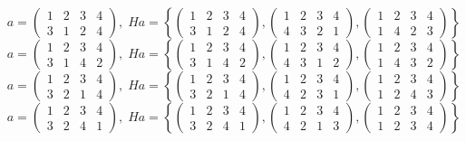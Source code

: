 \documentclass[a4paper,12pt]{article}
\begin{document}
\begin{itemize}
\[a = \begin{pmatrix} 1 & 2 & 3 & 4 \\ 3&1&2&4\end{pmatrix}, \; Ha = \left\{\begin{pmatrix} 1 & 2 & 3 & 4 \\ 3&1&2&4\end{pmatrix}, \begin{pmatrix} 1 & 2 & 3 & 4 \\ 4&3&2&1\end{pmatrix}, \begin{pmatrix} 1 & 2 & 3 & 4 \\ 1&4&2&3\end{pmatrix} \right\}\]
\[a = \begin{pmatrix} 1 & 2 & 3 & 4 \\ 3&1&4&2\end{pmatrix}, \; Ha = \left\{\begin{pmatrix} 1 & 2 & 3 & 4 \\ 3&1&4&2\end{pmatrix}, \begin{pmatrix} 1 & 2 & 3 & 4 \\ 4&3&1&2\end{pmatrix}, \begin{pmatrix} 1 & 2 & 3 & 4 \\ 1&4&3&2\end{pmatrix} \right\}\]
\[a = \begin{pmatrix} 1 & 2 & 3 & 4 \\ 3&2&1&4\end{pmatrix}, \; Ha = \left\{\begin{pmatrix} 1 & 2 & 3 & 4 \\ 3&2&1&4\end{pmatrix}, \begin{pmatrix} 1 & 2 & 3 & 4 \\ 4&2&3&1\end{pmatrix}, \begin{pmatrix} 1 & 2 & 3 & 4 \\ 1&2&4&3\end{pmatrix} \right\}\]
\[a = \begin{pmatrix} 1 & 2 & 3 & 4 \\ 3&2&4&1\end{pmatrix}, \; Ha = \left\{\begin{pmatrix} 1 & 2 & 3 & 4 \\ 3&2&4&1\end{pmatrix}, \begin{pmatrix} 1 & 2 & 3 & 4 \\ 4&2&1&3\end{pmatrix}, \begin{pmatrix} 1 & 2 & 3 & 4 \\ 1&2&3&4\end{pmatrix} \right\}\]

\end{itemize}
\end{document}
